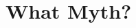 \documentclass[12pt]{article}
\begin{document}
% 


\section{What Myth?} %
\label{sec:what_myth_}


 
 
\end{document}
